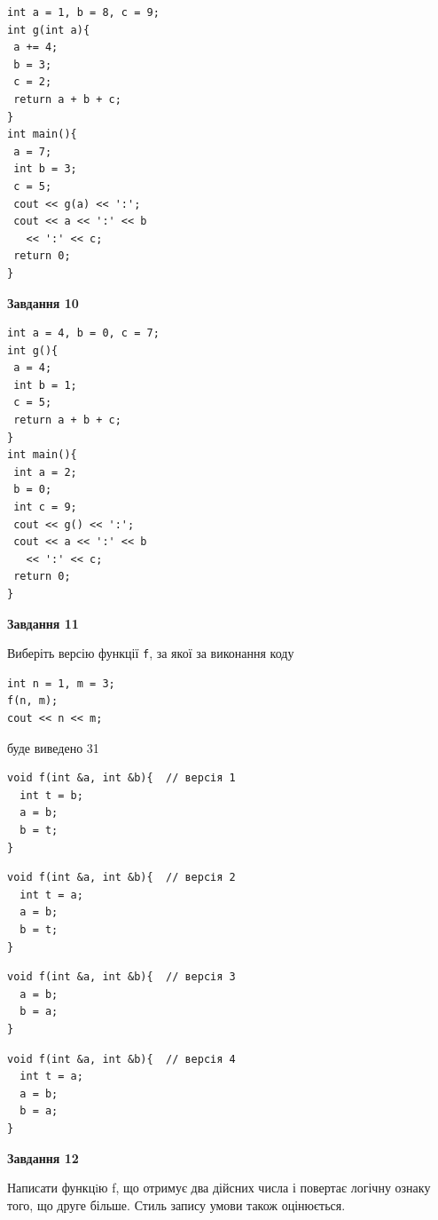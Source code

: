 \documentclass[12pt, ukrainian]{article}
\def\code#1{\Verb!#1!}
\begin{document}
{\begin {large}
\begin{minipage}[t]{7.0cm}
\begin{verbatim}
int a = 1, b = 8, c = 9;
int g(int a){
 a += 4;
 b = 3;
 c = 2;
 return a + b + c;
}
int main(){
 a = 7;
 int b = 3;
 c = 5;
 cout << g(a) << ':';
 cout << a << ':' << b 
   << ':' << c;
 return 0;
}
\end{verbatim}



\begin{center}
\textbf{Завдання 10}
\end{center}
\vspace{-8mm}

\begin{verbatim}
int a = 4, b = 0, c = 7;
int g(){
 a = 4;
 int b = 1;
 c = 5;
 return a + b + c;
}
int main(){
 int a = 2;
 b = 0;
 int c = 9;
 cout << g() << ':';
 cout << a << ':' << b 
   << ':' << c;
 return 0;
}
\end{verbatim}

\end{minipage}
\vline \hspace{1mm}
\begin{minipage}[t]{11.0cm}

\begin{center}
\textbf{Завдання 11}
\end{center}
Виберіть версію функції \code{f}, за якої за виконання коду
\begin{verbatim}
int n = 1, m = 3;
f(n, m);
cout << n << m;
\end{verbatim}

буде виведено 31

\begin{verbatim}
void f(int &a, int &b){  // версія 1
  int t = b;
  a = b;
  b = t;
}
\end{verbatim}

\vspace{-8mm}\begin{verbatim}
void f(int &a, int &b){  // версія 2
  int t = a;
  a = b;
  b = t;
}
\end{verbatim}

\vspace{-8mm}\begin{verbatim}
void f(int &a, int &b){  // версія 3
  a = b;
  b = a;
}
\end{verbatim}

\vspace{-8mm}\begin{verbatim}
void f(int &a, int &b){  // версія 4
  int t = a;
  a = b;
  b = a;
}
\end{verbatim}



\begin{center}
\textbf{Завдання 12}
\end{center}

Написати функцiю f, що отримує два дійсних числа і повертає логічну ознаку того, що друге більше. Стиль запису умови також оцінюється.\par

\end{minipage}

\end {large}}
\newpage
\end{document}
